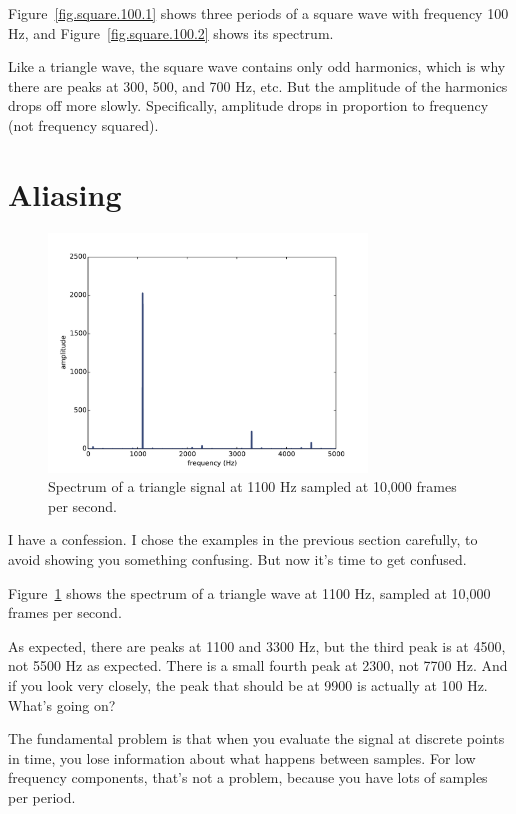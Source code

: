 \documentclass[12pt]{book}
\begin{document}
Figure~\ref{fig.square.100.1} shows three periods of a square
wave with frequency 100 Hz,
and Figure~\ref{fig.square.100.2} shows its spectrum.

Like a triangle wave, the square wave contains only odd harmonics,
which is why there are peaks at 300, 500, and 700 Hz, etc.
But the amplitude of the harmonics drops off more slowly.
Specifically, amplitude drops in proportion to frequency (not frequency
squared).


\section{Aliasing}

\begin{figure}
\centerline{\includegraphics[height=2.5in]{figs/triangle-1100-2.pdf}}
\caption{Spectrum of a triangle signal at 1100 Hz sampled at
10,000 frames per second.}
\label{fig.triangle.1100.2}
\end{figure}

I have a confession.  I chose the examples in the previous section
carefully,
to avoid showing you something confusing.  But now it's time to get
confused.

Figure~\ref{fig.triangle.1100.2} shows the spectrum of a triangle wave at 1100 Hz, sampled
at 10,000 frames per second.

As expected, there are peaks at 1100 and 3300 Hz, but the third
peak is at 4500, not 5500 Hz as expected.  There is a small fourth peak
at 2300, not 7700 Hz.  And if you look very closely, the peak that should
be at 9900 is actually at 100 Hz.  What's going on?

The fundamental problem is that when you evaluate the signal at
discrete points in time, you lose information about what happens
between samples.  For low frequency components, that's not a
problem, because you have lots of samples per period.
\end{document}
